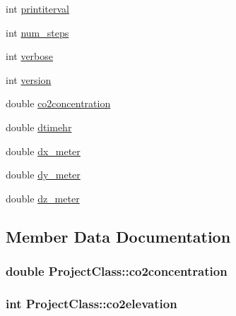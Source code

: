 \begin{DoxyCompactItemize}
int \hyperlink{class_project_class_a0c025cf10a2aaca5b52917c1aa01701c}{printiterval}
\item 
int \hyperlink{class_project_class_aa510654eb646d34f23eefb039c64c60e}{num\+\_\+steps}
\item 
int \hyperlink{class_project_class_ac028f816fdf665a3979c95a87e5944e1}{verbose}
\item 
int \hyperlink{class_project_class_a6fd99e189467e273cb558bec34098936}{version}
\item 
double \hyperlink{class_project_class_aece7ea3e20cb972f4c6a71da46a817ae}{co2concentration}
\item 
double \hyperlink{class_project_class_afee0eb2a774e1d7423f39ae55cf2963c}{dtimehr}
\item 
double \hyperlink{class_project_class_af2cc759ffefd164797a124137cf233db}{dx\+\_\+meter}
\item 
double \hyperlink{class_project_class_a6e261aaac976c251f71b07fef2985852}{dy\+\_\+meter}
\item 
double \hyperlink{class_project_class_a45514fe6cab9c6f1638f247f70fc9b18}{dz\+\_\+meter}
\end{DoxyCompactItemize}


\subsection{Member Data Documentation}
\subsubsection[{\texorpdfstring{co2concentration}{co2concentration}}]{\setlength{\rightskip}{0pt plus 5cm}double Project\+Class\+::co2concentration}\hypertarget{class_project_class_aece7ea3e20cb972f4c6a71da46a817ae}{}\label{class_project_class_aece7ea3e20cb972f4c6a71da46a817ae}
\subsubsection[{\texorpdfstring{co2elevation}{co2elevation}}]{\setlength{\rightskip}{0pt plus 5cm}int Project\+Class\+::co2elevation}\hypertarget{class_project_class_a5c406f6440301c7d7860bc1be0738190}{}\label{class_project_class_a5c406f6440301c7d7860bc1be0738190}

